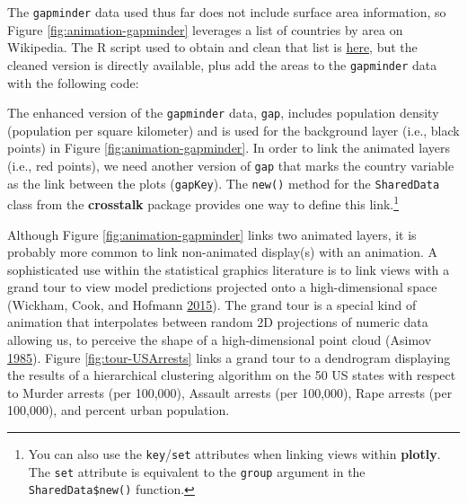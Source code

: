 \documentclass[12pt,]{isuthesis}
\newenvironment{Shaded}{\begin{snugshade}}{\end{snugshade}}
\newcommand{\KeywordTok}[1]{\textcolor[rgb]{0.13,0.29,0.53}{\textbf{{#1}}}}
\newcommand{\DataTypeTok}[1]{\textcolor[rgb]{0.13,0.29,0.53}{{#1}}}
\newcommand{\StringTok}[1]{\textcolor[rgb]{0.31,0.60,0.02}{{#1}}}
\newcommand{\OtherTok}[1]{\textcolor[rgb]{0.56,0.35,0.01}{{#1}}}
\newcommand{\NormalTok}[1]{{#1}}
\let\rmarkdownfootnote\footnote%
\def\footnote{\protect\rmarkdownfootnote}
\begin{document}
The \texttt{gapminder} data used thus far does not include surface area
information, so Figure \ref{fig:animation-gapminder} leverages a list of
countries by area on Wikipedia. The R script used to obtain and clean
that list is
\href{https://gist.github.com/cpsievert/d4a4ccb7ce61e2cfaecf9736de4f67fa}{here},
but the cleaned version is directly available, plus add the areas to the
\texttt{gapminder} data with the following code:

\begin{Shaded}
\end{Shaded}

The enhanced version of the \texttt{gapminder} data, \texttt{gap},
includes population density (population per square kilometer) and is
used for the background layer (i.e., black points) in Figure
\ref{fig:animation-gapminder}. In order to link the animated layers
(i.e., red points), we need another version of \texttt{gap} that marks
the country variable as the link between the plots (\texttt{gapKey}).
The \texttt{new()} method for the \texttt{SharedData} class from the
\textbf{crosstalk} package provides one way to define this
link.\footnote{You can also use the \texttt{key}/\texttt{set} attributes
  when linking views within \textbf{plotly}. The \texttt{set} attribute
  is equivalent to the \texttt{group} argument in the
  \texttt{SharedData\$new()} function.}

Although Figure \ref{fig:animation-gapminder} links two animated layers,
it is probably more common to link non-animated display(s) with an
animation. A sophisticated use within the statistical graphics
literature is to link views with a grand tour to view model predictions
projected onto a high-dimensional space (Wickham, Cook, and Hofmann
\protect\hyperlink{ref-model-vis-paper}{2015}). The grand tour is a
special kind of animation that interpolates between random 2D
projections of numeric data allowing us, to perceive the shape of a
high-dimensional point cloud (Asimov
\protect\hyperlink{ref-grand-tour}{1985}). Figure
\ref{fig:tour-USArrests} links a grand tour to a dendrogram displaying
the results of a hierarchical clustering algorithm on the 50 US states
with respect to Murder arrests (per 100,000), Assault arrests (per
100,000), Rape arrests (per 100,000), and percent urban population.
\end{document}

